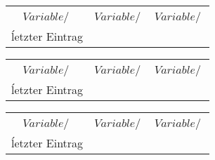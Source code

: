 \begin{minipage}[c][__hoehe__][t]{0.49\textwidth}
		\centering
		\begin{tabular}{S[table-format=] S[table-format=] S[table-format=]}
			\toprule
			\\
			{$Variable/\:\si{}$} & {$Variable/\:\si{}$} & {$Variable/\:\si{}$} \\	
			\midrule
				ĺetzter Eintrag\\
			\bottomrule
			\end{tabular}
	\end{minipage}
	\begin{minipage}[c][__hoehe__][t]{0.49\textwidth}
		\centering
		\begin{tabular}{S[table-format=] S[table-format=] S[table-format=]}
			\toprule
			\\
			{$Variable/\:\si{}$} & {$Variable/\:\si{}$} & {$Variable/\:\si{}$} \\	
			\midrule
				ĺetzter Eintrag\\
			\bottomrule
			\end{tabular}
	\end{minipage}
	\begin{minipage}[c][__hoehe__][t]{0.49\textwidth}
		\centering
		\begin{tabular}{S[table-format=] S[table-format=] S[table-format=]}
			\toprule
			\\
			{$Variable/\:\si{}$} & {$Variable/\:\si{}$} & {$Variable/\:\si{}$} \\	
			\midrule
				ĺetzter Eintrag\\
			\bottomrule
			\end{tabular}
	\end{minipage}
\begin{figure}[ht]
	\caption{}
	\label{}
\end{figure}